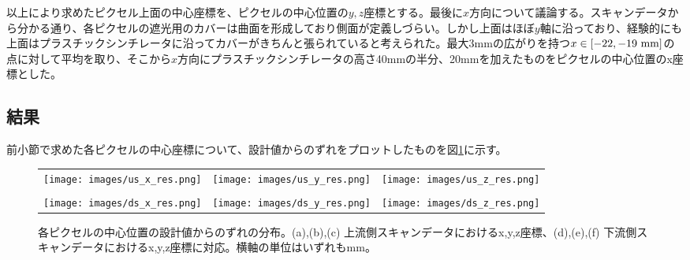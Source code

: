 \documentclass[Yonemoto_master.tex]{subfiles}
\begin{document}
以上により求めたピクセル上面の中心座標を、ピクセルの中心位置の$y, z$座標とする。最後に$x$方向について議論する。スキャンデータから分かる通り、各ピクセルの遮光用のカバーは曲面を形成しており側面が定義しづらい。しかし上面はほぼ$y$軸に沿っており、経験的にも上面はプラスチックシンチレータに沿ってカバーがきちんと張られていると考えられた。最大3mmの広がりを持つ$x \in [-22, -19 {\rm \ mm}]$の点に対して平均を取り、そこから$x$方向にプラスチックシンチレータの高さ40mmの半分、20mmを加えたものをピクセルの中心位置のx座標とした。

\subsection{結果}
前小節で求めた各ピクセルの中心座標について、設計値からのずれをプロットしたものを図\ref{fig: result}に示す。
\begin{figure}[h]
    \begin{tabular}{ccc}
      \begin{minipage}[t]{0.30\hsize}
        \centering
        \texttt{[image: images/us\_x\_res.png]}
        \caption*{(a)}
      \end{minipage} &
      \begin{minipage}[t]{0.30\hsize}
        \centering
        \texttt{[image: images/us\_y\_res.png]}
         \caption*{(b)}
      \end{minipage} &
      \begin{minipage}[t]{0.30\hsize}
        \centering
        \texttt{[image: images/us\_z\_res.png]}
         \caption*{(c)}
      \end{minipage} \\ \\
      \begin{minipage}[t]{0.30\hsize}
        \centering
        \texttt{[image: images/ds\_x\_res.png]}
        \caption*{(d)}
      \end{minipage} &
      \begin{minipage}[t]{0.30\hsize}
        \centering
        \texttt{[image: images/ds\_y\_res.png]}
         \caption*{(e)}
      \end{minipage} &
      \begin{minipage}[t]{0.30\hsize}
        \centering
        \texttt{[image: images/ds\_z\_res.png]}
         \caption*{(f)}
      \end{minipage} \\
    \end{tabular}
    \caption{各ピクセルの中心位置の設計値からのずれの分布。(a),(b),(c) 上流側スキャンデータにおけるx,y,z座標、(d),(e),(f) 下流側スキャンデータにおけるx,y,z座標に対応。横軸の単位はいずれもmm。}
    \label{fig: result}
  \end{figure}
\end{document}
